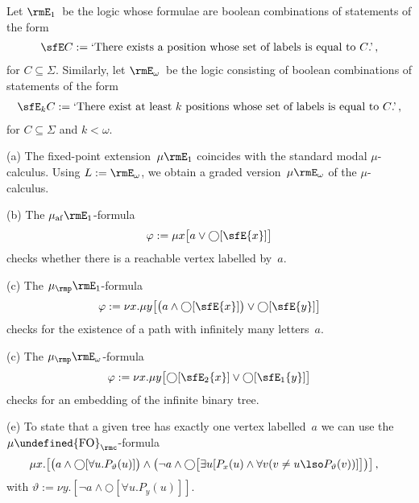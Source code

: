 \documentclass[10pt, fleqn]{scrartcl}
\makeatletter
\newcommand\m@thsm@ller[2]{\mbox{\relscale{0.91}$\m@th#1#2$}}
\let\smaller\undefined
\DeclareRobustCommand\smaller[1]{\relax\ifmmode{\mathpalette\m@thsm@ller{#1}}\else{\relscale{0.91}#1}\fi}
\newcommand*{\FO}{\smaller{\mathrm{FO}}}
\newcommand*{\muaf}{\mu_{\mathrm{af}}}
\newcommand*{\mup}{\mu_\rmp}
\newcommand*{\?}{\kern .08em}
\newcommand\medcircle{\bigcirc}
\makeatother
\begin{document}
\begin{Exams}
Let $\rmE_1$~be the logic whose formulae are boolean combinations of statements
of the form
\begin{align*}
  \sfE C := \text{`There exists a position whose set of labels is equal to~$C$.'}\,,
\end{align*}
for $C \subseteq \Sigma$.
Similarly, let $\rmE_\omega$~be the logic consisting of boolean combinations of statements
of the form
\begin{align*}
  \sfE_k C := \text{`There exist at least~$k$ positions whose set of labels is equal to~$C$.'}\,,
\end{align*}
for $C \subseteq \Sigma$ and $k < \omega$.

(a)
The fixed-point extension~$\mu\rmE_1$ coincides with the standard modal $\mu$-calculus.
Using $L := \rmE_\omega$, we obtain a graded version~$\mu\rmE_\omega$ of the $\mu$-calculus.

(b) The $\muaf\rmE_1$-formula
\begin{align*}
  \varphi := \mu x\bigl[a \lor {\medcircle}[\sfE\{x\}]\bigr]
\end{align*}
checks whether there is a reachable vertex labelled by~$a$.

(c) The $\mup\rmE_1$-formula
\begin{align*}
  \varphi := \nu x.\mu y\bigl[\bigl(a \land {\medcircle}[\sfE\{x\}]\bigr)
                              \lor {\medcircle}[\sfE\{y\}]\bigr]
\end{align*}
checks for the existence of a path with infinitely many letters~$a$.

(c) The $\mup\rmE_\omega$-formula
\begin{align*}
  \varphi := \nu x.\mu y\bigl[{\medcircle}[\sfE_2\{x\}] \lor {\medcircle}[\sfE_1\{y\}]\bigr]
\end{align*}
checks for an embedding of the infinite binary tree.

(e) To state that a given tree has exactly one vertex labelled~$a$ we can use the
$\mu\FO_\rmc$-formula
\begin{align*}
  &\mu x.\bigl[\bigl(a \land {\medcircle}[\forall u.P_\vartheta(u)]\bigr)
              \land \bigl(\neg a \land {\medcircle}\bigl[
                      \exists u[P_x(u) \land
                                \forall v(v \neq u \lso P_\vartheta(v))]
                      \bigr]\bigr)\bigr]\,,
\end{align*}
with $\vartheta := \nu y.[\neg a \land {\medcircle}[\forall u.P_y(u)]]$.
\end{Exams}
\end{document}
